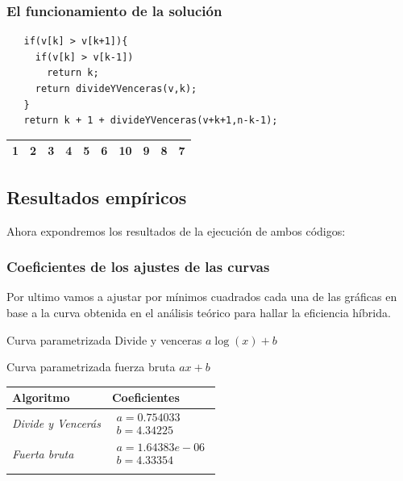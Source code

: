 \documentclass[compress]{beamer}
\begin{document}
\begin{frame}[fragile]
  \frametitle{El funcionamiento de la solución}
  \begin{lstlisting}
   if(v[k] > v[k+1]){
     if(v[k] > v[k-1]) 
       return k;
     return divideYVenceras(v,k);
   }
   return k + 1 + divideYVenceras(v+k+1,n-k-1);
\end{lstlisting}

\begin{center}
  \begin{tabular}{|l|l|l|l|l|l|l|l|l|l|}
\hline
1 & 2 & 3 & 4 & 5 & 6 & 10 & 9 & 8 & 7 \\ \hline
\end{tabular}
\end{center}
\end{frame}



\subsection{Resultados empíricos}
\begin{frame}
	Ahora expondremos los resultados de la ejecución de ambos códigos:
\end{frame}
	
\begin{frame}
\frametitle{Coeficientes de los ajustes de las curvas}
Por ultimo vamos a ajustar por mínimos cuadrados cada una de las gráficas en base a la curva obtenida en el análisis teórico para hallar la eficiencia híbrida.

\begin{block}{Curva parametrizada Divide y venceras}
	$a\log(x)+b$
\end{block}

\begin{block}{Curva parametrizada fuerza bruta}
	$ax+b$
\end{block}
\end{frame}

\begin{frame}
	\begin{center}
	\begin{tabular}{ll}
	Algoritmo & Coeficientes\\ \hline\noalign{\smallskip}
	\textit{Divide y Vencerás} & $\begin{array}{ll}
	a = 0.754033 \\
b = 4.34225 
\end{array}$ \\\hline\noalign{\smallskip}
	\textit{Fuerta bruta} & $\begin{array}{ll}
	a = 1.64383e-06 \\
b = 4.33354

\end{array}$ \\\hline\noalign{\smallskip}
\end{tabular}
\end{center}
\end{frame}
\end{document}
